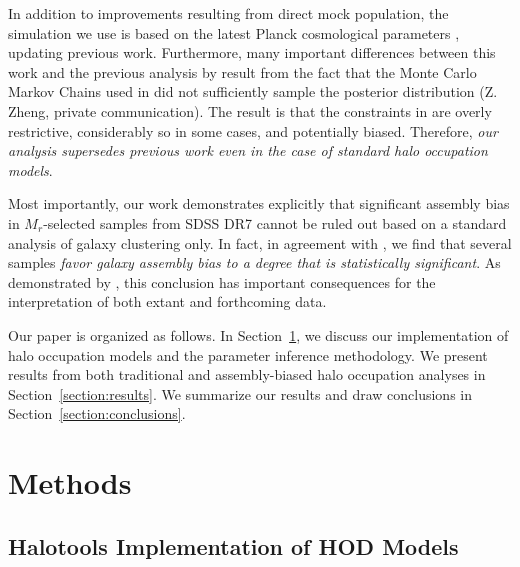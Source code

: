 \documentclass[usenatbib,usegraphicx,letterpaper]{mn2e}
\newcommand{\magr}{M_r}
\begin{document}
In addition to improvements resulting from direct mock population,
the simulation we use is based on the latest Planck cosmological
parameters \citep{planck13}, updating previous work.
Furthermore, many important differences between this work 
and the previous analysis by \citet{zehavi_etal11} result from 
the fact that the Monte Carlo Markov Chains used in \citet{zehavi_etal11} did not 
sufficiently sample the posterior distribution (Z. Zheng, private communication). 
The result is that the constraints in \citet{zehavi_etal11} are overly restrictive, considerably so 
in some cases, and potentially biased. 
Therefore, {\em our analysis supersedes previous work even in the case of
standard halo occupation models}.


Most importantly, our work demonstrates explicitly that significant
assembly bias in $\magr$-selected samples from SDSS DR7 cannot be ruled
out based on a standard analysis of galaxy clustering only. In fact,
in agreement with \citet{lehmann_etal15}, we find that several samples
{\em favor galaxy assembly bias to a degree that is statistically
  significant}. As demonstrated by \citet{zentner_etal14}, this
conclusion has important consequences for the interpretation of
both extant and forthcoming data.


Our paper is organized as follows. In Section~\ref{section:methods},
we discuss our implementation of halo occupation models and the
parameter inference methodology. We present results
from both traditional and assembly-biased halo occupation analyses
in Section~\ref{section:results}. We summarize our results and draw
conclusions in Section~\ref{section:conclusions}.


\section{Methods}
\label{section:methods}

\subsection{Halotools Implementation of HOD Models}
\label{subsection:halotools}
\end{document}
